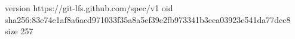 version https://git-lfs.github.com/spec/v1
oid sha256:83e74e1af8a6acd971033f35a8a5ef39e2fb973341b3eea03923e541da77dcc8
size 257
